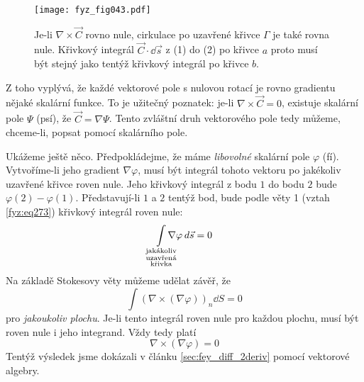{    \begin{figure}[ht!]  %
      \centering
      \texttt{[image: fyz\_fig043.pdf]}
      \caption{Je-li \(\nabla\times\vec{C}\) rovno nule, cirkulace po uzavřené křivce \(\Gamma\)   
        je také rovna nule. Křivkový integrál \(\vec{C}\cdot\dd{\vec{s}}\) z (1) do (2) po 
        křivce \(a\) proto musí být stejný jako tentýž křivkový integrál po křivce \(b\).}
      \label{fyz:fig043}
    \end{figure}
    Z toho vyplývá, že každé vektorové pole s nulovou rotací je rovno gradientu nějaké skalární 
    funkce. To je užitečný poznatek: je-li \(\nabla\times\vec{C}=0\), existuje skalární pole 
    \(\Psi\) (psí), že \(\vec{C}=\nabla\Psi\). Tento zvláštní druh vektorového pole tedy můžeme, 
    chceme-li, popsat pomocí skalárního pole.
    
    Ukážeme ještě něco. Předpokládejme, že máme \emph{libovolné} skalární pole \(\varphi\) (fí). 
    Vytvoříme-li jeho gradient \(\nabla\varphi\), musí být integrál tohoto vektoru po jakékoliv 
    uzavřené křivce  roven nule. Jeho křivkový integrál z bodu \(1\) do bodu \(2\) bude 
    \(\varphi(2) - \varphi(1)\). Představují-li \(1\) a \(2\) tentýž bod, bude podle věty 1 (vztah 
    \ref{fyz:eq273}) křivkový integrál roven nule:
    \begin{equation}\label{fyz:eq359}
      \limitint_{\mathclap{\substack{\text{jakákoliv}\\\text{uzavřená}\\\text{křivka}}}}
        \nabla\varphi\dd{\vec{s}} = 0
    \end{equation}
    Na základě Stokesovy věty můžeme udělat závěř, že 
    \begin{equation}\label{fyz:eq_fey_null0} 
      \int(\nabla\times(\nabla\varphi))_n\dd{S} = 0
    \end{equation} 
    pro \emph{jakoukoliv plochu}. Je-li tento integrál roven nule pro každou plochu, musí být 
    roven nule i jeho integrand. Vždy tedy platí
    \begin{equation}
      \nabla\times(\nabla\varphi) = 0
    \end{equation}
    Tentýž výsledek jsme dokázali v článku \ref{sec:fey_diff_2deriv} pomocí vektorové algebry.      
    
}
